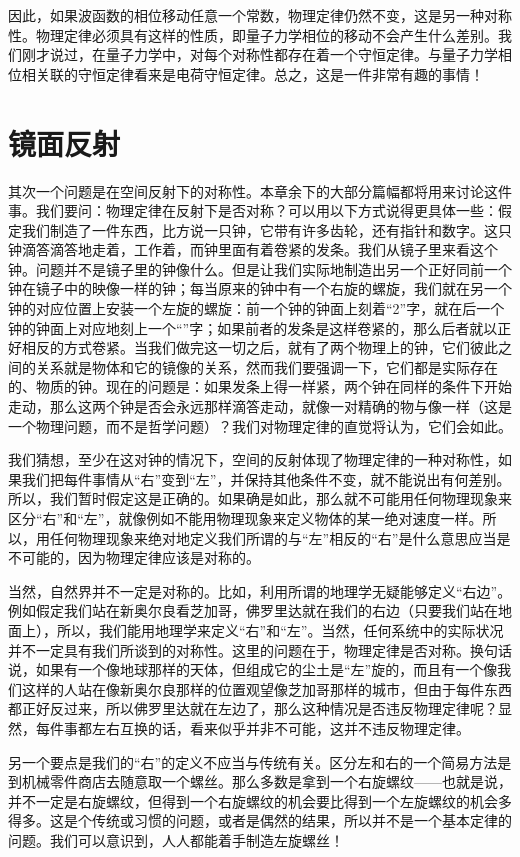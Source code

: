 因此，如果波函数的相位移动任意一个常数，物理定律仍然不变，这是另一种对称性。物理定律必须具有这样的性质，即量子力学相位的移动不会产生什么差别。我们刚才说过，在量子力学中，对每个对称性都存在着一个守恒定律。与量子力学相位相关联的守恒定律看来是电荷守恒定律。总之，这是一件非常有趣的事情！

\section{镜面反射}

其次一个问题是在空间反射下的对称性。本章余下的大部分篇幅都将用来讨论这件事。我们要问：物理定律在反射下是否对称？可以用以下方式说得更具体一些：假定我们制造了一件东西，比方说一只钟，它带有许多齿轮，还有指针和数字。这只钟滴答滴答地走着，工作着，而钟里面有着卷紧的发条。我们从镜子里来看这个钟。问题并不是镜子里的钟像什么。但是让我们实际地制造出另一个正好同前一个钟在镜子中的映像一样的钟；每当原来的钟中有一个右旋的螺旋，我们就在另一个钟的对应位置上安装一个左旋的螺旋：前一个钟的钟面上刻着“2”字，就在后一个钟的钟面上对应地刻上一个“”字；如果前者的发条是这样卷紧的，那么后者就以正好相反的方式卷紧。当我们做完这一切之后，就有了两个物理上的钟，它们彼此之间的关系就是物体和它的镜像的关系，然而我们要强调一下，它们都是实际存在的、物质的钟。现在的问题是：如果发条上得一样紧，两个钟在同样的条件下开始走动，那么这两个钟是否会永远那样滴答走动，就像一对精确的物与像一样（这是一个物理问题，而不是哲学问题）？我们对物理定律的直觉将认为，它们会如此。

我们猜想，至少在这对钟的情况下，空间的反射体现了物理定律的一种对称性，如果我们把每件事情从“右”变到“左”，并保持其他条件不变，就不能说出有何差别。所以，我们暂时假定这是正确的。如果确是如此，那么就不可能用任何物理现象来区分“右”和“左”，就像例如不能用物理现象来定义物体的某一绝对速度一样。所以，用任何物理现象来绝对地定义我们所谓的与“左”相反的“右”是什么意思应当是不可能的，因为物理定律应该是对称的。

当然，自然界并不一定是对称的。比如，利用所谓的地理学无疑能够定义“右边”。例如假定我们站在新奥尔良看芝加哥，佛罗里达就在我们的右边（只要我们站在地面上），所以，我们能用地理学来定义“右”和“左”。当然，任何系统中的实际状况并不一定具有我们所谈到的对称性。这里的问题在于，物理定律是否对称。换句话说，如果有一个像地球那样的天体，但组成它的尘土是“左”旋的，而且有一个像我们这样的人站在像新奥尔良那样的位置观望像芝加哥那样的城市，但由于每件东西都正好反过来，所以佛罗里达就在左边了，那么这种情况是否违反物理定律呢？显然，每件事都左右互换的话，看来似乎并非不可能，这并不违反物理定律。

另一个要点是我们的“右”的定义不应当与传统有关。区分左和右的一个简易方法是到机械零件商店去随意取一个螺丝。那么多数是拿到一个右旋螺纹——也就是说，并不一定是右旋螺纹，但得到一个右旋螺纹的机会要比得到一个左旋螺纹的机会多得多。这是个传统或习惯的问题，或者是偶然的结果，所以并不是一个基本定律的问题。我们可以意识到，人人都能着手制造左旋螺丝！

